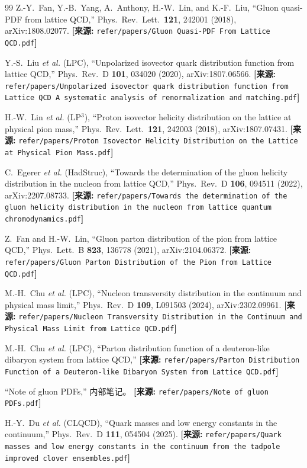 \documentclass[12pt,a4paper]{ctexart}
\theoremstyle{definition}
\begin{document}
\begin{thebibliography}{99}
Z.-Y.~Fan, Y.-B.~Yang, A.~Anthony, H.-W.~Lin, and K.-F.~Liu,
``Gluon quasi-PDF from lattice QCD,''
Phys.\ Rev.\ Lett.\ \textbf{121}, 242001 (2018), arXiv:1808.02077.
\quad\textbf{[来源:} \texttt{refer/papers/Gluon Quasi-PDF From Lattice QCD.pdf}\textbf{]}

Y.-S.~Liu \textit{et al.} (LPC),
``Unpolarized isovector quark distribution function from lattice QCD,''
Phys.\ Rev.\ D \textbf{101}, 034020 (2020), arXiv:1807.06566.
\quad\textbf{[来源:} \texttt{refer/papers/Unpolarized isovector quark distribution function from Lattice QCD A systematic analysis of renormalization and matching.pdf}\textbf{]}

H.-W.~Lin \textit{et al.} (LP$^3$),
``Proton isovector helicity distribution on the lattice at physical pion mass,''
Phys.\ Rev.\ Lett.\ \textbf{121}, 242003 (2018), arXiv:1807.07431.
\quad\textbf{[来源:} \texttt{refer/papers/Proton Isovector Helicity Distribution on the Lattice at Physical Pion Mass.pdf}\textbf{]}

C.~Egerer \textit{et al.} (HadStruc),
``Towards the determination of the gluon helicity distribution in the nucleon from lattice QCD,''
Phys.\ Rev.\ D \textbf{106}, 094511 (2022), arXiv:2207.08733.
\quad\textbf{[来源:} \texttt{refer/papers/Towards the determination of the gluon helicity distribution in the nucleon from lattice quantum chromodynamics.pdf}\textbf{]}

Z.~Fan and H.-W.~Lin,
``Gluon parton distribution of the pion from lattice QCD,''
Phys.\ Lett.\ B \textbf{823}, 136778 (2021), arXiv:2104.06372.
\quad\textbf{[来源:} \texttt{refer/papers/Gluon Parton Distribution of the Pion from Lattice QCD.pdf}\textbf{]}

M.-H.~Chu \textit{et al.} (LPC),
``Nucleon transversity distribution in the continuum and physical mass limit,''
Phys.\ Rev.\ D \textbf{109}, L091503 (2024), arXiv:2302.09961.
\quad\textbf{[来源:} \texttt{refer/papers/Nucleon Transversity Distribution in the Continuum and Physical Mass Limit from Lattice QCD.pdf}\textbf{]}

M.-H.~Chu \textit{et al.} (LPC),
``Parton distribution function of a deuteron-like dibaryon system from lattice QCD,''
\quad\textbf{[来源:} \texttt{refer/papers/Parton Distribution Function of a Deuteron-like Dibaryon System from Lattice QCD.pdf}\textbf{]}

``Note of gluon PDFs,'' 内部笔记。
\quad\textbf{[来源:} \texttt{refer/papers/Note of gluon PDFs.pdf}\textbf{]}

H.-Y.~Du \textit{et al.} (CLQCD), ``Quark masses and low energy constants in the continuum,''
Phys.\ Rev.\ D \textbf{111}, 054504 (2025).
\quad\textbf{[来源:} \texttt{refer/papers/Quark masses and low energy constants in the continuum from the tadpole improved clover ensembles.pdf}\textbf{]}

\end{thebibliography}
\end{document}
